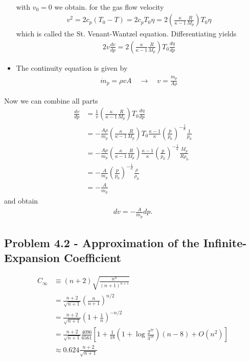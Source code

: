 \documentclass[10pt,a4paper]{book}
\theoremstyle{definition}
\begin{document}
\begin{itemize}
\begin{align}
\end{align}
with $v_0=0$ we obtain. for the gas flow velocity
\begin{align}
    v^2=2c_p(T_0-T)=2c_pT_0\eta=2\left(\frac{\kappa}{\kappa-1}\frac{R}{M_p}\right)T_0\eta
\end{align}
which is called the St. Venant-Wantzel equation. Differentiating yields
\begin{align}
2v\frac{dv}{dp}=2\left(\frac{\kappa}{\kappa-1}\frac{R}{M_p}\right)T_0\frac{d\eta}{dp}
\end{align}
\item The continuity equation is given by
\begin{align}
    \dot m_p=\rho vA\quad\rightarrow\quad v=\frac{\dot m_p}{A\rho}
\end{align}
\end{itemize}
Now we can combine all parts
\begin{align}
    \frac{dv}{dp}
    &=\frac{1}{v}\left(\frac{\kappa}{\kappa-1}\frac{R}{M_p}\right)T_0\frac{d\eta}{dp}\\
    &=-\frac{A\rho}{\dot m_p}\left(\frac{\kappa}{\kappa-1}\frac{R}{M_p}\right)T_0\frac{\kappa-1}{\kappa}\left(\frac{p}{p_0}\right)^{-\frac{1}{\kappa}}\frac{1}{p_0}\\
    &=-\frac{A\rho}{\dot m_p}\left(\frac{\kappa}{\kappa-1}\frac{R}{M_p}\right)\frac{\kappa-1}{\kappa}\left(\frac{p}{p_0}\right)^{-\frac{1}{\kappa}}\frac{M_p}{R\rho_0}\\
    &=-\frac{A}{\dot m_p}\left(\frac{p}{p_0}\right)^{-\frac{1}{\kappa}}\frac{\rho}{\rho_0}\\
    &=-\frac{A}{\dot m_p}
\end{align}
and obtain
\begin{align}
    dv=-\frac{A}{\dot m_p}dp.
\end{align}

\subsection{Problem 4.2 - Approximation of the Infinite-Expansion Coefficient}
\begin{align}
    C_\infty&\equiv(n+2)\sqrt{\frac{n^n}{(n+1)^{n+1}}}\\
    &=\frac{n+2}{\sqrt{n+1}}\left(\frac{n}{n+1}\right)^{n/2}\\
    &=\frac{n+2}{\sqrt{n+1}}\left(1+\frac{1}{n}\right)^{-n/2}\\
    &=\frac{n+2}{\sqrt{n+1}}\frac{4096}{6561}\left[1+\frac{1}{18}\left(1+\log\frac{2^{27}}{3^{18}}\right)(n-8) +O\left(n^2\right)\right]\\
    &\approx 0.624 \frac{n+2}{\sqrt{n+1}}
\end{align}
\end{document}
